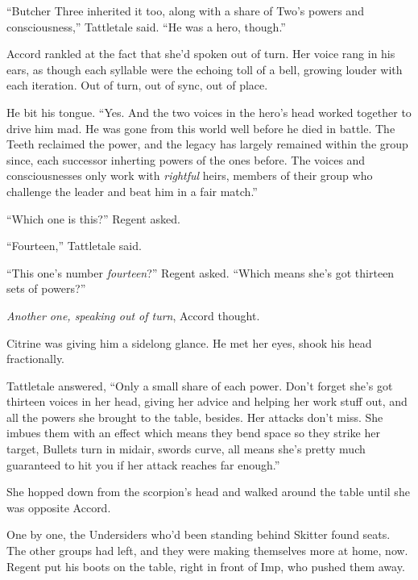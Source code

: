 ``Butcher Three inherited it too, along with a share of Two's powers and consciousness,'' Tattletale said.  ``He was a hero, though.''



Accord rankled at the fact that she'd spoken out of turn.  Her voice rang in his ears, as though each syllable were the echoing toll of a bell, growing louder with each iteration.  Out of turn, out of sync, out of place.



He bit his tongue.  ``Yes.  And the two voices in the hero's head worked together to drive him mad.  He was gone from this world well before he died in battle.  The Teeth reclaimed the power, and the legacy has largely remained within the group since, each successor inherting powers of the ones before.  The voices and consciousnesses only work with \emph{rightful} heirs, members of their group who challenge the leader and beat him in a fair match.''



``Which one is this?'' Regent asked.



``Fourteen,'' Tattletale said.



``This one's number \emph{fourteen}?'' Regent asked.  ``Which means she's got thirteen sets of powers?''



\emph{Another one, speaking out of turn}, Accord thought.



Citrine was giving him a sidelong glance.  He met her eyes, shook his head fractionally.



Tattletale answered, ``Only a small share of each power.  Don't forget she's got thirteen voices in her head, giving her advice and helping her work stuff out, and all the powers she brought to the table, besides.  Her attacks don't miss.  She imbues them with an effect which means they bend space so they strike her target,  Bullets turn in midair, swords curve, all means she's pretty much guaranteed to hit you if her attack reaches far enough.''



She hopped down from the scorpion's head and walked around the table until she was opposite Accord.



One by one, the Undersiders who'd been standing behind Skitter found seats.  The other groups had left, and they were making themselves more at home, now.  Regent put his boots on the table, right in front of Imp, who pushed them away.



